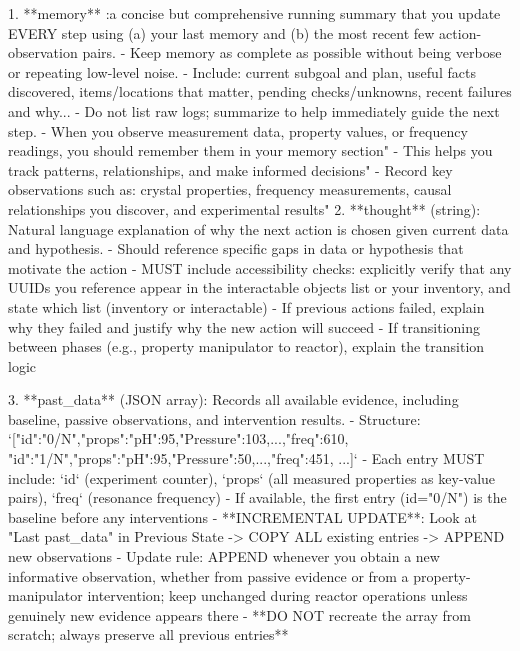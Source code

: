 \begin{tcblisting}
1. **memory** :a concise but comprehensive running summary that you update EVERY step using (a) your last memory and (b) the most recent few action-observation pairs.
   - Keep memory as complete as possible without being verbose or repeating low-level noise.
   - Include: current subgoal and plan, useful facts discovered, items/locations that matter, pending checks/unknowns, recent failures and why...
   - Do not list raw logs; summarize to help immediately guide the next step.
   - When you observe measurement data, property values, or frequency readings, you should remember them in your memory section"
   - This helps you track patterns, relationships, and make informed decisions"
   - Record key observations such as: crystal properties, frequency measurements, causal relationships you discover, and experimental results"
2. **thought** (string): Natural language explanation of why the next action is chosen given current data and hypothesis.
   - Should reference specific gaps in data or hypothesis that motivate the action
   - MUST include accessibility checks: explicitly verify that any UUIDs you reference appear in the interactable objects list or your inventory, and state which list (inventory or interactable)
   - If previous actions failed, explain why they failed and justify why the new action will succeed
   - If transitioning between phases (e.g., property manipulator to reactor), explain the transition logic

3. **past_data** (JSON array): Records all available evidence, including baseline, passive observations, and intervention results.
   - Structure: `[{"id":"0/N","props":{"pH":95,"Pressure":103,...},"freq":610}, {"id":"1/N","props":{"pH":95,"Pressure":50,...},"freq":451}, ...]`
   - Each entry MUST include: `id` (experiment counter), `props` (all measured properties as key-value pairs), `freq` (resonance frequency)
   - If available, the first entry (id="0/N") is the baseline before any interventions
   - **INCREMENTAL UPDATE**: Look at "Last past_data" in Previous State -> COPY ALL existing entries -> APPEND new observations
   - Update rule: APPEND whenever you obtain a new informative observation, whether from passive evidence or from a property-manipulator intervention; keep unchanged during reactor operations unless genuinely new evidence appears there
   - **DO NOT recreate the array from scratch; always preserve all previous entries**


\end{tcblisting}
